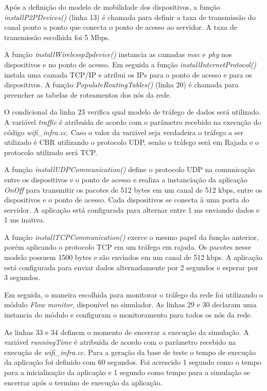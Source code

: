 \documentclass[12pt]{article}
\begin{document}
Após a definição do modelo de mobilidade dos dispositivos, a função \textit{installP2PDevices()} (linha 13) é chamada para definir a taxa de transmissão do canal ponto a ponto que conecta o ponto de acesso ao servidor. A taxa de transmissão escolhida foi 5 Mbps.

A função \textit{installWirelessp2pdevice()}  instancia as camadas \textit{mac} e \textit{phy} nos dispositivos e no ponto de acesso. Em seguida a função \textit{installInternetProtocol()} instala uma camada TCP/IP e atribui os IPs para o ponto de acesso e para os dispositivos. A função \textit{PopulateRoutingTables()} (linha 20) é chamada para preencher as tabelas de roteamentos dos nós da rede.

O condicional da linha 23 verifica qual modelo de tráfego de dados será utilizado. A variável \textit{traffic} é atribuída de acordo com o parâmetro recebido na execução do código \textit{wifi\_infra.cc}. Caso o valor da variável seja verdadeira o tráfego a ser utilizado é CBR utilizando o protocolo UDP, senão o tráfego será em Rajada e o protocolo utilizado será TCP.

A função \textit{installUDPCommunication()} define o protocolo UDP na comunicação entre os dispositivos e o ponto de acesso e realiza a instanciação da aplicação \textit{OnOff} para transmitir os pacotes de 512 bytes em um canal de 512 kbps, entre os dispositivos e o ponto de acesso. Cada dispositivos se conecta à uma porta do servidor. A aplicação está configurada para alternar entre 1 ms enviando dados e 1 ms inativa.

A função \textit{installTCPCommunication()} exerce o mesmo papel da função anterior, porém aplicando o protocolo TCP em um tráfego em rajada. Os pacotes nesse modelo possuem 1500 bytes e são enviados em um canal de 512 kbps. A aplicação está configurada para enviar dados alternadamente por 2 segundos e esperar por 3 segundos.

Em seguida, o maneira escolhida para monitorar o tráfego da rede foi utilizando o módulo \textit{Flow monitor}, disponível no simulador. As linhas 29 e 30 declaram uma instancia do módulo e configuram o monitoramento para todos os nós da rede.

As linhas 33 e 34 definem o momento de encerrar a execução da simulação. A variável \textit{runningTime} é atribuída de acordo com o parâmetro recebido na execução de \textit{wifi\_infra.cc}. Para a geração da base de teste o tempo de execução da aplicação foi definido com 60 segundos. Foi acrescido 1 segundo como o tempo para a inicialização da aplicação e 1 segundo como tempo para a simulação se encerrar após o termino de execução da aplicação.
\end{document}
